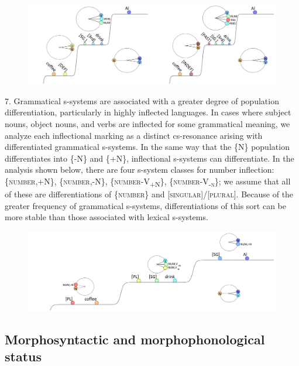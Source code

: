   
\begin{figure}
\includegraphics[width=\textwidth]{figures/Tilsen-img66.png}
\caption{\missingcaption}
\label{fig:}
\end{figure}
 

7. Grammatical s-systems are associated with a greater degree of population differentiation, particularly in highly inflected languages. In cases where subject nouns, object nouns, and verbs are inflected for some grammatical meaning, we analyze each inflectional marking as a distinct cs-resonance arising with differentiated grammatical s-systems. In the same way that the \{N\} population differentiates into \{-N\} and \{+N\}, inflectional s-systems can differentiate. In the analysis shown below, there are four s-system classes for number inflection: \{\textsc{number},+N\}, \{\textsc{number},-N\}, \{\textsc{number}{}-\textsc{V}\textsc{\textsubscript{+N}}\textsc{\}}, \{\textsc{number}{}-\textsc{V}\textsc{\textsubscript{{}-n}}\textsc{\};} we assume that all of these are differentiations of \{\textsc{number}\} and [\textsc{singular}]/[\textsc{plural}]. Because of the greater frequency of grammatical s-systems, differentiations of this sort can be more stable than those associated with lexical s-systems. 

  
\begin{figure}
\includegraphics[width=\textwidth]{figures/Tilsen-img67.png}
\caption{\missingcaption}
\label{fig:}
\end{figure}
 

\subsection{Morphosyntactic and morphophonological status}


